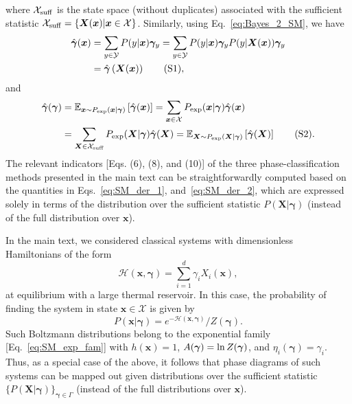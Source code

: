 \documentclass[twocolumn,aps,pra,superscriptaddress,tightlines,nofootinbib]{revtex4-2}
\newcommand\numberthis{\addtocounter{equation}{1}\tag{\theequation}}
\begin{document}
	where $\mathcal{X}_{\rm suff}$ is the state space (without duplicates) associated with the sufficient statistic $\mathcal{X}_{\rm suff} = \{\bm{X}(\bm{x}) | \bm{x} \in \mathcal{X} \}$. Similarly, using Eq.~\eqref{eq:Bayes_2_SM}, we have
	\begin{align*}
		\hat{\bm{\gamma}}(\bm{x}) &=  \sum_{y \in \mathcal{Y}} P(y|\bm{x})\bm{\gamma}_{y} = \sum_{y \in \mathcal{Y}} P(y|\bm{x})\bm{\gamma}_{y} P(y|\bm{X}(\bm{x}))\bm{\gamma}_{y}\\
		&= \hat{\bm{\gamma}}\left(\bm{X}(\bm{x})\right) \numberthis,
	\end{align*}
	and
	\begin{align*}\label{eq:SM_der_2}
		\hat{\bm{\gamma}}(\bm{\gamma}) &= \mathbb{E}_{\bm{x} \sim P_{\rm exp}(\bm{x}|\bm{\gamma})}\left[ \hat{\bm{\gamma}}(\bm{x})\right] = \sum_{\bm{x} \in \mathcal{X}} P_{\rm exp}(\bm{x}|\bm{\gamma})\hat{\bm{\gamma}}(\bm{x})\\
		&=  \sum_{\bm{X} \in \mathcal{X}_{\rm suff}} P_{\rm exp}(\bm{X}|\bm{\gamma}) \hat{\bm{\gamma}}(\bm{X}) = \mathbb{E}_{\bm{X} \sim P_{\rm exp}(\bm{X}|\bm{\gamma})}\left[  \hat{\bm{\gamma}}(\bm{X})\right]\numberthis.
	\end{align*}
	The relevant indicators [Eqs. (6), (8), and (10)] of the three phase-classification methods presented in the main text can be straightforwardly computed based on the quantities in Eqs.~\eqref{eq:SM_der_1}, and~\eqref{eq:SM_der_2}, which are expressed solely in terms of the distribution over the sufficient statistic $P(\bm{X}|\bm{\gamma})$ (instead of the full distribution over $\bm{x}$).
	
	In the main text, we considered classical systems with dimensionless Hamiltonians of the form
	\begin{equation}\label{eq:exp}
		\mathcal{H}(\bm{x},\bm{\gamma}) = \sum_{i=1}^{d} \gamma_{i} X_{i}(\bm{x}),
	\end{equation}
	at equilibrium with a large thermal reservoir. In this case, the probability of finding the system in state $\bm{x} \in \mathcal{X}$ is given by
	\begin{equation}\label{eq:Boltzmann_SM}
		P(\bm{x}| \bm{\gamma}) = e^{-\mathcal{H}(\bm{x},\bm{\gamma})}/Z(\bm{\gamma}).
	\end{equation}
	Such Boltzmann distributions belong to the exponential family [Eq.~\eqref{eq:SM_exp_fam}] with $h(\bm{x}) = 1$, $A(\bm{\gamma}) = {\rm ln}\,Z(\bm{\gamma})$, and $\eta_{i}(\bm{\gamma}) = \gamma_{i}$. Thus, as a special case of the above, it follows that phase diagrams of such systems can be mapped out given distributions over the sufficient statistic $\{P(\bm{X}|\bm{\gamma})\}_{\bm{\gamma} \in \Gamma}$ (instead of the full distributions over $\bm{x}$).
	
\end{document}
